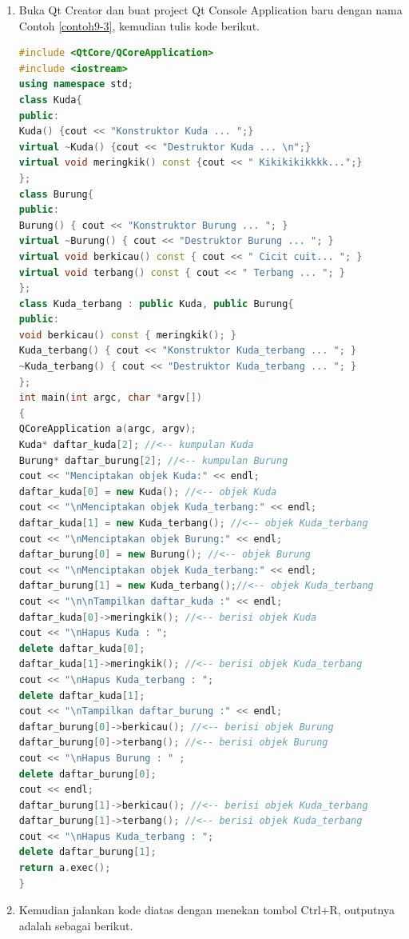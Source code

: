 \begin{enumerate}

\item
  Buka Qt Creator dan buat project Qt Console Application baru dengan
  nama Contoh \ref{contoh9-3}, kemudian tulis kode berikut.

\begin{lstlisting}[language=c++, caption=Multiple Inheritance, label=contoh9-3]
#include <QtCore/QCoreApplication>
#include <iostream>
using namespace std;
class Kuda{
public:
Kuda() {cout << "Konstruktor Kuda ... ";}
virtual ~Kuda() {cout << "Destruktor Kuda ... \n";}
virtual void meringkik() const {cout << " Kikikikikkkk...";}
};
class Burung{
public:
Burung() { cout << "Konstruktor Burung ... "; }
virtual ~Burung() { cout << "Destruktor Burung ... "; }
virtual void berkicau() const { cout << " Cicit cuit... "; }
virtual void terbang() const { cout << " Terbang ... "; }
};
class Kuda_terbang : public Kuda, public Burung{
public:
void berkicau() const { meringkik(); }
Kuda_terbang() { cout << "Konstruktor Kuda_terbang ... "; }
~Kuda_terbang() { cout << "Destruktor Kuda_terbang ... "; }
};
int main(int argc, char *argv[])
{
QCoreApplication a(argc, argv);
Kuda* daftar_kuda[2]; //<-- kumpulan Kuda
Burung* daftar_burung[2]; //<-- kumpulan Burung
cout << "Menciptakan objek Kuda:" << endl;
daftar_kuda[0] = new Kuda(); //<-- objek Kuda
cout << "\nMenciptakan objek Kuda_terbang:" << endl;
daftar_kuda[1] = new Kuda_terbang(); //<-- objek Kuda_terbang
cout << "\nMenciptakan objek Burung:" << endl;
daftar_burung[0] = new Burung(); //<-- objek Burung
cout << "\nMenciptakan objek Kuda_terbang:" << endl;
daftar_burung[1] = new Kuda_terbang();//<-- objek Kuda_terbang
cout << "\n\nTampilkan daftar_kuda :" << endl;
daftar_kuda[0]->meringkik(); //<-- berisi objek Kuda
cout << "\nHapus Kuda : ";
delete daftar_kuda[0];
daftar_kuda[1]->meringkik(); //<-- berisi objek Kuda_terbang
cout << "\nHapus Kuda_terbang : ";
delete daftar_kuda[1];
cout << "\nTampilkan daftar_burung :" << endl;
daftar_burung[0]->berkicau(); //<-- berisi objek Burung
daftar_burung[0]->terbang(); //<-- berisi objek Burung
cout << "\nHapus Burung : " ;
delete daftar_burung[0];
cout << endl;
daftar_burung[1]->berkicau(); //<-- berisi objek Kuda_terbang
daftar_burung[1]->terbang(); //<-- berisi objek Kuda_terbang
cout << "\nHapus Kuda_terbang : ";
delete daftar_burung[1];
return a.exec();
}
\end{lstlisting}
\item
  Kemudian jalankan kode diatas dengan menekan tombol Ctrl+R, outputnya
  adalah sebagai berikut.
\end{enumerate}


